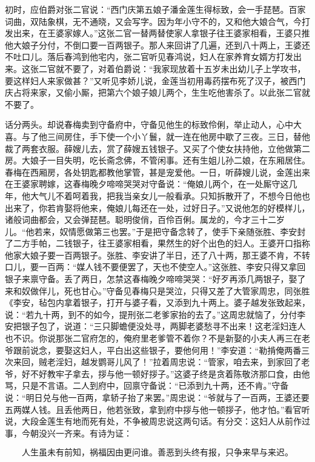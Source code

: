 初时，应伯爵对张二官说：“西门庆第五娘子潘金莲生得标致，会一手琵琶。百家词曲，双陆象棋，无不通晓，又会写字。因为年小守不的，又和他大娘合气，今打发出来，在王婆家嫁人。”这张二官一替两替使家人拿银子往王婆家相看，王婆只推他大娘子分付，不倒口要一百两银子。那人来回讲了几遍，还到八十两上，王婆还不吐口儿。落后春鸿到他宅内，张二官听见春鸿说，妇人在家养育女婿方打发出来。这张二官就不要了，对着伯爵说：“我家现放着十五岁未出幼儿子上学攻书，要这样妇人来家做甚？”又听见李娇儿说，金莲当初用毒药摆布死了汉子，被西门庆占将来家，又偷小厮，把第六个娘子娘儿两个，生生吃他害杀了。以此张二官就不要了。

话分两头。却说春梅卖到守备府中，守备见他生的标致伶俐，举止动人，心中大喜。与了他三间房住，手下使一个小丫鬟，就一连在他房中歇了三夜。三日，替他裁了两套衣服。薛嫂儿去，赏了薛嫂五钱银子。又买了个使女扶持他，立他做第二房。大娘子一目失明，吃长斋念佛，不管闲事。还有生姐儿孙二娘，在东厢居住。春梅在西厢房，各处钥匙都教他掌管，甚是宠爱他。一日，听薛嫂儿说，金莲出来在王婆家聘嫁，这春梅晚夕啼啼哭哭对守备说：“俺娘儿两个，在一处厮守这几年，他大气儿不着呵着我，把我当亲女儿一般看承。只知拆散开了，不想今日他也出来了，你若肯娶将他来，俺娘儿每还在一处，过好日子。”又说他怎的好模样儿，诸般词曲都会，又会弹琵琶。聪明俊俏，百伶百俐。属龙的，今才三十二岁儿。“他若来，奴情愿做第三也罢。”于是把守备念转了，使手下亲随张胜、李安封了二方手帕，二钱银子，往王婆家相看，果然生的好个出色的妇人。王婆开口指称他家大娘子要一百两银子。张胜、李安讲了半日，还了八十两，那王婆不肯，不转口儿，要一百两：“媒人钱不要便罢了，天也不使空人。”这张胜、李安只得又拿回银子来禀守备。丢了两日，怎禁这春梅晚夕啼啼哭哭：“好歹再添几两银子，娶了来和奴做伴儿，死也甘心。”守备见春梅只是哭泣，只得又差了大管家周忠，同张胜《李安，毡包内拿着银子，打开与婆子看，又添到九十两上。婆子越发张致起来，说：“若九十两，到不的如今，提刑张二老爹家抬的去了。”这周忠就恼了，分付李安把银子包了，说道：“三只脚蟾便没处寻，两脚老婆愁寻不出来！这老淫妇连人也不识。你说那张二官府怎的，俺府里老爹管不着你？不是新娶的小夫人再三在老爷跟前说念，要娶这妇人，平白出这些银子，要他何用！”李安道：“勒掯俺两番三次来回，贼老淫妇，越发鹦哥儿风了！”拉着周忠说：“管家，咱去来，到家回了老爷，好不好教牢子拿去，拶与他一顿好拶子。”这婆子终是贪着陈敬济那口食，由他骂，只是不言语。二人到府中，回禀守备说：“已添到九十两，还不肯。”守备说：“明日兑与他一百两，拿轿子抬了来罢。”周忠说：“爷就与了一百两，王婆还要五两媒人钱。且丢他两日，他若张致，拿到府中拶与他一顿拶子，他才怕。”看官听说，大段金莲生有地而死有处，不争被周忠说这两句话。有分交：这妇人从前作过事，今朝没兴一齐来。有诗为证：

\[
人生虽未有前知，祸福因由更问谁。
善恶到头终有报，只争来早与来迟。
\]


